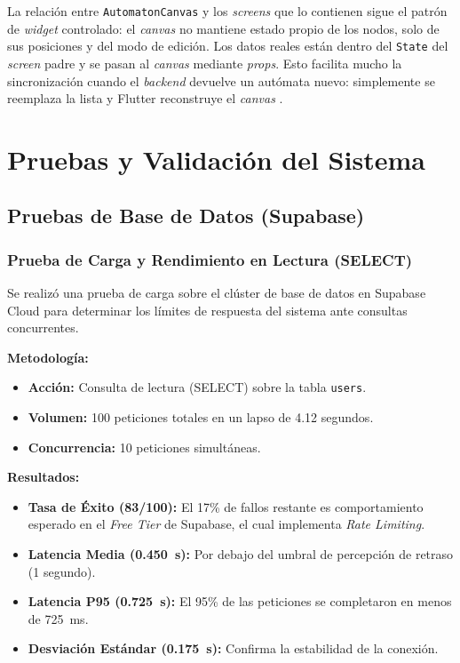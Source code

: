 La relación entre \texttt{AutomatonCanvas} y los \textit{screens} que lo contienen sigue el patrón
de \textit{widget} controlado: el \textit{canvas} no mantiene estado propio de los nodos, solo de
sus posiciones y del modo de edición. Los datos reales están dentro del \texttt{State} del
\textit{screen} padre y se pasan al \textit{canvas} mediante \textit{props}. Esto facilita mucho
la sincronización cuando el \textit{backend} devuelve un autómata nuevo: simplemente se reemplaza
la lista y Flutter reconstruye el \textit{canvas} \cite{flutter2024c}.
\newpage
\section{Pruebas y Validación del Sistema}
\label{sec:pruebas}

\subsection{Pruebas de Base de Datos (Supabase)}
\label{subsec:pruebas_supabase}

\subsubsection*{Prueba de Carga y Rendimiento en Lectura (SELECT)}

Se realizó una prueba de carga sobre el clúster de base de datos en Supabase Cloud para determinar
los límites de respuesta del sistema ante consultas concurrentes.

\textbf{Metodología:}
\begin{itemize}
    \item \textbf{Acción:} Consulta de lectura (SELECT) sobre la tabla \texttt{users}.
    \item \textbf{Volumen:} 100 peticiones totales en un lapso de 4.12 segundos.
    \item \textbf{Concurrencia:} 10 peticiones simultáneas.
\end{itemize}

\textbf{Resultados:}
\begin{itemize}
    \item \textbf{Tasa de Éxito (83/100):} El 17\% de fallos restante es comportamiento esperado
    en el \textit{Free Tier} de Supabase, el cual implementa \textit{Rate Limiting}.
    \item \textbf{Latencia Media (0.450~s):} Por debajo del umbral de percepción de retraso
    (1 segundo).
    \item \textbf{Latencia P95 (0.725~s):} El 95\% de las peticiones se completaron en menos de
    725~ms.
    \item \textbf{Desviación Estándar (0.175~s):} Confirma la estabilidad de la conexión.
\end{itemize}

